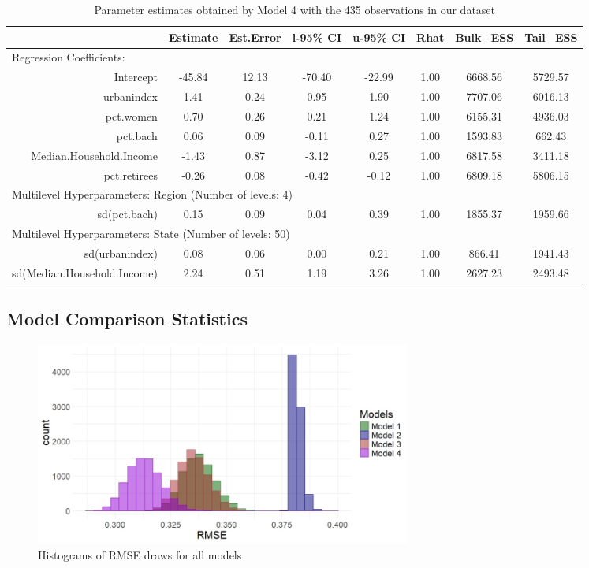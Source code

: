 \documentclass[12pt]{article}
\begin{document}
\begin{table}[h]
	\centering
	\begin{adjustbox}{max width=\textwidth}
	\begin{tabular}{rccccccc}
		\hline
		& Estimate & Est.Error & l-95\% CI & u-95\% CI & Rhat & Bulk\_ESS & Tail\_ESS \\ 
		\hline
				 \multicolumn{8}{l}{Regression Coefficients:} \\
		Intercept & -45.84 & 12.13 & -70.40 & -22.99 & 1.00 & 6668.56 & 5729.57 \\ 
		urbanindex & 1.41 & 0.24 & 0.95 & 1.90 & 1.00 & 7707.06 & 6016.13 \\ 
		pct.women & 0.70 & 0.26 & 0.21 & 1.24 & 1.00 & 6155.31 & 4936.03 \\ 
		pct.bach & 0.06 & 0.09 & -0.11 & 0.27 & 1.00 & 1593.83 & 662.43 \\ 
		Median.Household.Income & -1.43 & 0.87 & -3.12 & 0.25 & 1.00 & 6817.58 & 3411.18 \\ 
		pct.retirees & -0.26 & 0.08 & -0.42 & -0.12 & 1.00 & 6809.18 & 5806.15 \\
		\midrule
		\multicolumn{8}{l}{Multilevel Hyperparameters: Region (Number of levels: 4)} \\ 
		sd(pct.bach) & 0.15 & 0.09 & 0.04 & 0.39 & 1.00 & 1855.37 & 1959.66 \\
		\midrule
		\multicolumn{8}{l}{Multilevel Hyperparameters: State (Number of levels: 50)}                       \\  
		sd(urbanindex) & 0.08 & 0.06 & 0.00 & 0.21 & 1.00 & 866.41 & 1941.43 \\ 
		sd(Median.Household.Income) & 2.24 & 0.51 & 1.19 & 3.26 & 1.00 & 2627.23 & 2493.48 \\ 
		\hline
	\end{tabular}
	\end{adjustbox}
	\caption{Parameter estimates obtained by Model 4 with the 435 observations in our dataset}
	\label{tab:model4}
\end{table}







\FloatBarrier
\clearpage
\subsection*{Model Comparison Statistics}


\begin{figure}[h]
	\centering
	\includegraphics[width=0.6\textwidth]{model_comp_figures/RMSE_all.jpeg}
	\caption{Histograms of RMSE draws for all models}
	\label{fig:rmse}
\end{figure}
\end{document}
